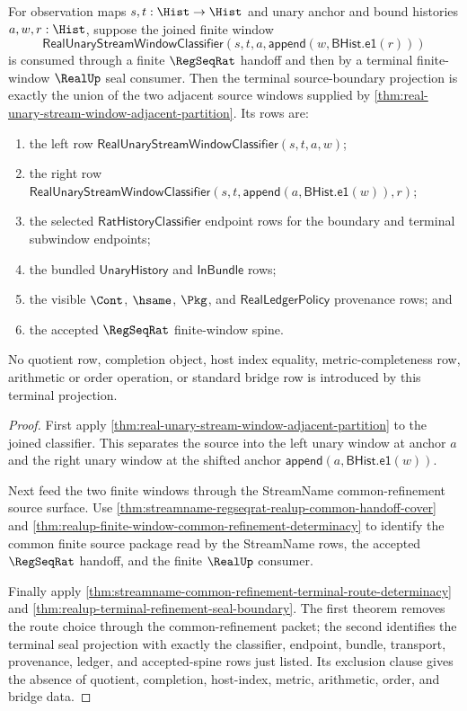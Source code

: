 \begin{theorem}
\label{thm:real-unary-adjacent-window-terminal-source-boundary}
For observation maps $s,t:\Hist\to\Hist$ and unary anchor and bound histories
$a,w,r:\Hist$, suppose the joined finite window
$$
\mathsf{RealUnaryStreamWindowClassifier}
(s,t,a,\mathsf{append}(w,\mathsf{BHist.e1}(r)))
$$
is consumed through a finite $\RegSeqRat$ handoff and then by a terminal
finite-window $\RealUp$ seal consumer. Then the terminal source-boundary
projection is exactly the union of the two adjacent source windows supplied by
\autoref{thm:real-unary-stream-window-adjacent-partition}. Its rows are:
\begin{enumerate}
\item the left row
$\mathsf{RealUnaryStreamWindowClassifier}(s,t,a,w)$;
\item the right row
$\mathsf{RealUnaryStreamWindowClassifier}
(s,t,\mathsf{append}(a,\mathsf{BHist.e1}(w)),r)$;
\item the selected $\mathsf{RatHistoryClassifier}$ endpoint rows for the
boundary and terminal subwindow endpoints;
\item the bundled $\mathsf{UnaryHistory}$ and $\mathsf{InBundle}$ rows;
\item the visible $\Cont$, $\hsame$, $\Pkg$, and
$\mathsf{RealLedgerPolicy}$ provenance rows; and
\item the accepted $\RegSeqRat$ finite-window spine.
\end{enumerate}
No quotient row, completion object, host index equality,
metric-completeness row, arithmetic or order operation, or standard bridge row
is introduced by this terminal projection.
\end{theorem}
\begin{proof}
First apply
\autoref{thm:real-unary-stream-window-adjacent-partition} to the joined
classifier. This separates the source into the left unary window at anchor
$a$ and the right unary window at the shifted anchor
$\mathsf{append}(a,\mathsf{BHist.e1}(w))$.

Next feed the two finite windows through the StreamName common-refinement
source surface. Use
\autoref{thm:streamname-regseqrat-realup-common-handoff-cover} and
\autoref{thm:realup-finite-window-common-refinement-determinacy} to identify
the common finite source package read by the StreamName rows, the accepted
$\RegSeqRat$ handoff, and the finite $\RealUp$ consumer.

Finally apply
\autoref{thm:streamname-common-refinement-terminal-route-determinacy} and
\autoref{thm:realup-terminal-refinement-seal-boundary}. The first theorem
removes the route choice through the common-refinement packet; the second
identifies the terminal seal projection with exactly the classifier,
endpoint, bundle, transport, provenance, ledger, and accepted-spine rows just
listed. Its exclusion clause gives the absence of quotient, completion,
host-index, metric, arithmetic, order, and bridge data.
\end{proof}

